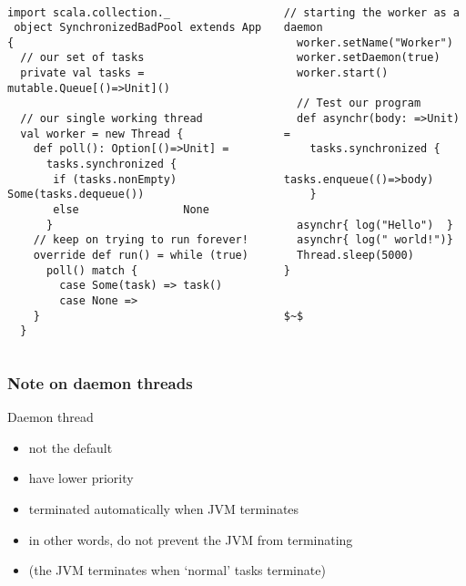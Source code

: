 \documentclass[aspectratio=169]{beamer}
\begin{document}
\begin{frame}[fragile]\frametitle{}
~\\[-8mm]
\begin{columns}
\begin{column}{0.65\textwidth}
\begin{lstlisting}[emph={synchronized,printUniqueIds,sleep,log,thread,join}]
 import scala.collection._
 object SynchronizedBadPool extends App {
  // our set of tasks
  private val tasks = mutable.Queue[()=>Unit]()
 
  // our single working thread
  val worker = new Thread {
    def poll(): Option[()=>Unit] = 
      tasks.synchronized {
       if (tasks.nonEmpty) Some(tasks.dequeue())
       else                None
      }
    // keep on trying to run forever!
    override def run() = while (true)
      poll() match {
        case Some(task) => task()
        case None =>
    }
  }
\end{lstlisting}
\end{column}
\begin{column}{0.40\textwidth}
\begin{lstlisting}[mathescape,emph={synchronized,sleep,log,thread,join}]
  // starting the worker as a daemon
  worker.setName("Worker")
  worker.setDaemon(true)
  worker.start()

  // Test our program
  def asynchr(body: =>Unit) =
    tasks.synchronized {
      tasks.enqueue(()=>body)
    }

  asynchr{ log("Hello")  }
  asynchr{ log(" world!")}
  Thread.sleep(5000)
}


$~$
\end{lstlisting}
\end{column}
\end{columns}
\end{frame}


\begin{frame}\frametitle{Note on daemon threads}
  \begin{alertblock}{Daemon thread}
    \begin{itemize}
      \item not the default
      \item have lower priority
      \item terminated automatically when JVM terminates
      \item in other words, do not prevent the JVM from terminating
      \item (the JVM terminates when `normal' tasks terminate)
    \end{itemize}    
  \end{alertblock}
\end{frame}
\end{document}

